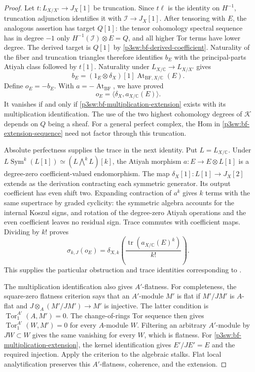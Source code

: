 \documentclass[11pt]{article}
\newcommand{\C}{\mathbb C}
\numberwithin{equation}{section}
\begin{document}
\begin{proof}
Let \(t:L_{X/X'}\to J_X[1]\) be truncation.  Since \(t\ell\)
is the identity on \(H^{-1}\), truncation adjunction identifies
it with \(\mathcal I\to J_X[1]\).  After tensoring with \(E\),
the analogous assertion has target \(Q[1]\): the tensor
cohomology spectral sequence has in degree \(-1\) only
\(H^{-1}(\mathcal I)\otimes E=Q\), and all higher Tor terms
have lower degree.  The derived target is \(Q[1]\) by
\eqref{p3sw:bf-derived-coefficient}.  Naturality of the fiber
and truncation triangles therefore identifies \(b_E\) with the
principal-parts Atiyah class followed by \(t[1]\).  Naturality
under \(L_{X/\C}\to L_{X/X'}\) gives
\[
 b_E=(1_E\otimes\delta_X)[1]\operatorname{At}_{\mathrm{BF},X/\C}(E).
\]
Define \(o_E=-b_E\).  With \(a=-\operatorname{At}_{\mathrm{BF}}\),
we have proved
\begin{equation}
\label{p3sw:bf-obstruction}
 o_E=\langle\delta_X,a_{X/\C}(E)\rangle.
\end{equation}
It vanishes if and only if
\eqref{p3sw:bf-multiplication-extension} exists with its
multiplication identification.
The use of the two highest cohomology degrees of \(\mathcal K\)
depends on \(Q\) being a sheaf.  For a general perfect complex,
the Hom in \eqref{p3sw:bf-extension-sequence} need not factor
through this truncation.

Absolute perfectness supplies the trace in the next identity.
Put \(L=L_{X/\C}\).  Under
\(L\operatorname{Sym}^k(L[1])\simeq(L\!\bigwedge^kL)[k]\),
the Atiyah morphism \(a:E\to E\otimes L[1]\) is a degree-zero
coefficient-valued endomorphism.  The map
\(\delta_X[1]:L[1]\to J_X[2]\) extends as the derivation
contracting each symmetric generator.  Its output coefficient
has even shift two.  Expanding contraction of \(a^k\) gives
\(k\) terms with the same supertrace by graded cyclicity: the
symmetric algebra accounts for the internal Koszul signs, and
rotation of the degree-zero Atiyah operations and the even
coefficient leaves no residual sign.  Trace commutes with
coefficient maps.  Dividing by \(k!\) proves
\begin{equation}
\label{p3sw:bf-trace-identity}
 \sigma_{k,J}(o_E)
 =\delta_{X,k}\left(\frac{\operatorname{tr}(a_{X/\C}(E)^k)}{k!}\right).
\end{equation}
This supplies the particular obstruction and trace identities
corresponding to \cite[Propositions~4.4 and 4.2, pp.~166--169]{P3SWBuchweitzFlenner2003}.

The multiplication identification also gives \(A'\)-flatness.
For completeness, the square-zero flatness criterion says that
an \(A'\)-module \(M'\) is flat if \(M'/JM'\) is \(A\)-flat and
\(J\otimes_A(M'/JM')\to M'\) is injective.  The latter
condition is \(\operatorname{Tor}^{A'}_1(A,M')=0\).
The change-of-rings Tor sequence then gives
\(\operatorname{Tor}^{A'}_1(W,M')=0\) for every \(A\)-module
\(W\).  Filtering an arbitrary \(A'\)-module by \(JW\subset W\)
gives the same vanishing for every \(W\), which is flatness.
For \eqref{p3sw:bf-multiplication-extension}, the kernel
identification gives \(E'/JE'=E\) and the required injection.
Apply the criterion to the algebraic stalks.  Flat local
analytification preserves this \(A'\)-flatness, coherence, and
the extension.


\end{proof}
\end{document}
